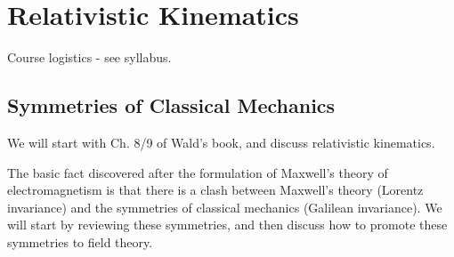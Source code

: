\section{Relativistic Kinematics}
Course logistics - see syllabus.

\subsection{Symmetries of Classical Mechanics}
We will start with Ch. 8/9 of Wald's book, and discuss relativistic kinematics.

The basic fact discovered after the formulation of Maxwell's theory of electromagnetism is that there is a clash between Maxwell's theory (Lorentz invariance) and the symmetries of classical mechanics (Galilean invariance). We will start by reviewing these symmetries, and then discuss how to promote these symmetries to field theory.

